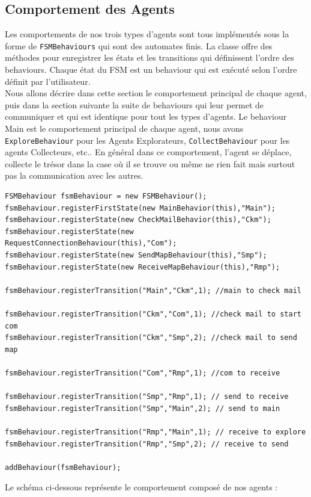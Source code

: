 \documentclass[10pt]{article}
\newcommand\tab[1][0.65cm]{\hspace*{#1}}
\begin{document}
	\subsection{Comportement des Agents}
	Les comportements de nos trois types d'agents sont tous implémentés sous la forme de \texttt{FSMBehaviours} qui sont des automates finis. La classe offre des méthodes pour enregistrer les états et les transitions qui définissent l'ordre des behaviours.	Chaque état du FSM est un behaviour qui est exécuté selon l'ordre définit par l'utilisateur.\\
	\tab Nous allons décrire dans cette section le comportement principal de chaque agent, puis dans la section suivante la suite de behaviours qui leur permet de communiquer et qui est identique pour tout les types d'agents. Le behaviour Main est le comportement principal de chaque agent, nous avons \texttt{ExploreBehaviour} pour les Agents Explorateurs, \texttt{CollectBehaviour} pour les agents Collecteurs, etc.. En général dans ce comportement, l'agent se déplace, collecte le trésor dans la case où il se trouve ou même ne rien fait mais surtout pas la communication avec les autres.

\begin{lstlisting}
FSMBehaviour fsmBehaviour = new FSMBehaviour();
fsmBehaviour.registerFirstState(new MainBehavior(this),"Main");
fsmBehaviour.registerState(new CheckMailBehavior(this),"Ckm");
fsmBehaviour.registerState(new RequestConnectionBehaviour(this),"Com");
fsmBehaviour.registerState(new SendMapBehaviour(this),"Smp");
fsmBehaviour.registerState(new ReceiveMapBehaviour(this),"Rmp");

fsmBehaviour.registerTransition("Main","Ckm",1); //main to check mail

fsmBehaviour.registerTransition("Ckm","Com",1); //check mail to start com
fsmBehaviour.registerTransition("Ckm","Smp",2); //check mail to send map

fsmBehaviour.registerTransition("Com","Rmp",1); //com to receive

fsmBehaviour.registerTransition("Smp","Rmp",1); // send to receive
fsmBehaviour.registerTransition("Smp","Main",2); // send to main

fsmBehaviour.registerTransition("Rmp","Main",1); // receive to explore
fsmBehaviour.registerTransition("Rmp","Smp",2); // receive to send

addBehaviour(fsmBehaviour);
\end{lstlisting}
Le schéma ci-dessous représente le comportement composé de nos agents :
\end{document}
